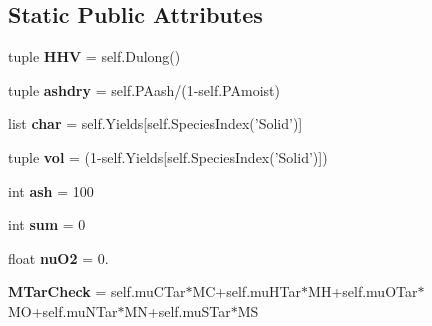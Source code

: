 \subsection*{\-Static \-Public \-Attributes}
\begin{DoxyCompactItemize}
\item 
\hypertarget{classCompos__and__Energy_1_1CPD__SpeciesBalance_ac3d3804ee4b37fd70a7955ca2060d180}{tuple {\bfseries \-H\-H\-V} = self.\-Dulong()}\label{classCompos__and__Energy_1_1CPD__SpeciesBalance_ac3d3804ee4b37fd70a7955ca2060d180}

\item 
\hypertarget{classCompos__and__Energy_1_1CPD__SpeciesBalance_a42f53843e09151397046910398f5d958}{tuple {\bfseries ashdry} = self.\-P\-Aash/(1-\/self.\-P\-Amoist)}\label{classCompos__and__Energy_1_1CPD__SpeciesBalance_a42f53843e09151397046910398f5d958}

\item 
\hypertarget{classCompos__and__Energy_1_1CPD__SpeciesBalance_a348aaf1b58522e52a78d044cbc96f7e7}{list {\bfseries char} = self.\-Yields\mbox{[}self.\-Species\-Index('\-Solid')\mbox{]}}\label{classCompos__and__Energy_1_1CPD__SpeciesBalance_a348aaf1b58522e52a78d044cbc96f7e7}

\item 
\hypertarget{classCompos__and__Energy_1_1CPD__SpeciesBalance_aca2fe35de233b1a0c7b3806e0becee53}{tuple {\bfseries vol} = (1-\/self.\-Yields\mbox{[}self.\-Species\-Index('\-Solid')\mbox{]})}\label{classCompos__and__Energy_1_1CPD__SpeciesBalance_aca2fe35de233b1a0c7b3806e0becee53}

\item 
\hypertarget{classCompos__and__Energy_1_1CPD__SpeciesBalance_a1fbb01c2d6b1f6ff41aa574fc48ebdd4}{int {\bfseries ash} = 100}\label{classCompos__and__Energy_1_1CPD__SpeciesBalance_a1fbb01c2d6b1f6ff41aa574fc48ebdd4}

\item 
\hypertarget{classCompos__and__Energy_1_1CPD__SpeciesBalance_aaf48fc4518fe773ed3fd06aa7636ecf6}{int {\bfseries sum} = 0}\label{classCompos__and__Energy_1_1CPD__SpeciesBalance_aaf48fc4518fe773ed3fd06aa7636ecf6}

\item 
\hypertarget{classCompos__and__Energy_1_1CPD__SpeciesBalance_a62a31b7e7146ef6fa335b9382ffaeb61}{float {\bfseries nu\-O2} = 0.}\label{classCompos__and__Energy_1_1CPD__SpeciesBalance_a62a31b7e7146ef6fa335b9382ffaeb61}

\item 
\hypertarget{classCompos__and__Energy_1_1CPD__SpeciesBalance_a8e5bc50ca6f10a09164e2e1283cda937}{{\bfseries \-M\-Tar\-Check} = self.\-mu\-C\-Tar$\ast$\-M\-C+self.\-mu\-H\-Tar$\ast$\-M\-H+self.\-mu\-O\-Tar$\ast$\-M\-O+self.\-mu\-N\-Tar$\ast$\-M\-N+self.\-mu\-S\-Tar$\ast$\-M\-S}\label{classCompos__and__Energy_1_1CPD__SpeciesBalance_a8e5bc50ca6f10a09164e2e1283cda937}


\end{DoxyCompactItemize}
